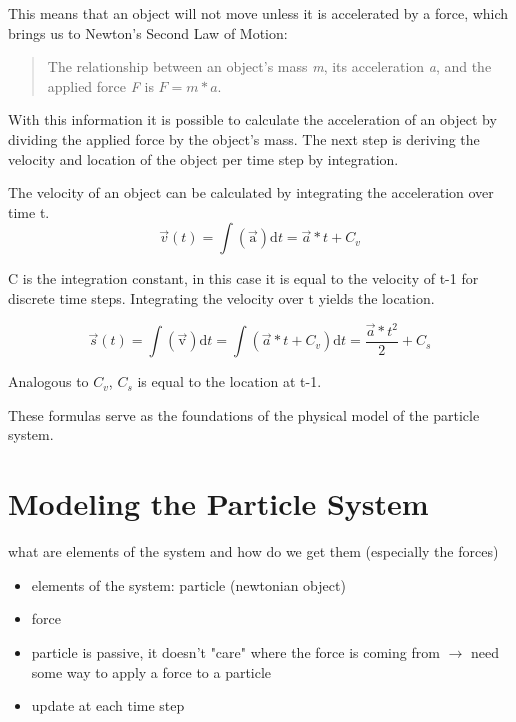 \documentclass[runningheads,a4paper]{llncs}
\begin{document}
This means that an object will not move unless it is accelerated by a force, which brings us to Newton's Second Law of Motion:
\begin{quotation}
The relationship between an object's mass \emph{m}, its acceleration \emph{a}, and the applied force \emph{F} is $ F = m*a $.
\end{quotation}

With this information it is possible to calculate the acceleration of an object by dividing the applied force by the object's mass. The next step is deriving the velocity and location of the object per time step by integration.

The velocity of an object can be calculated by integrating the acceleration over time t. 
\begin{equation}
\overrightarrow{v}(t) = \int \mathrm{(\overrightarrow{a})} \mathrm{d}t = \overrightarrow{a}*t + C_v
\label{eq:vel}
\end{equation}

C is the integration constant, in this case it is equal to the velocity of t-1 for discrete time steps. Integrating the velocity over t yields the location.

\begin{equation}
\overrightarrow{s}(t) = \int \mathrm{(\overrightarrow{v})} \mathrm{d}t = \int (\overrightarrow{a}*t + C_v) \mathrm{d}t = \frac{\overrightarrow{a}*t^2}{2} + C_s
\label{eq:loc}
\end{equation}

Analogous to $C_v$, $C_s$ is equal to the location at t-1.

These formulas serve as the foundations of the physical model of the particle system. 

\section{Modeling the Particle System}
what are elements of the system and how do we get them (especially the forces)

\begin{itemize}
\item elements of the system: particle (newtonian object)
\item force
\item particle is passive, it doesn't "care" where the force is coming from $\rightarrow$ need some way to apply a force to a particle
\item update at each time step
\end{itemize}
\end{document}
